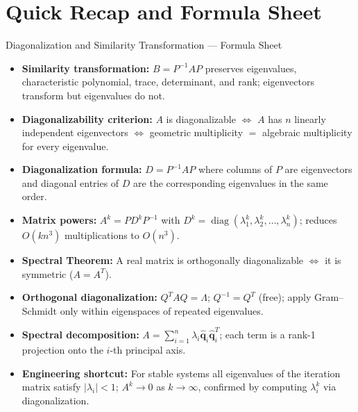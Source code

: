 \documentclass[12pt,a4paper]{article}
\begin{document}
\section{Quick Recap and Formula Sheet}

\begin{learnbox}{Diagonalization and Similarity Transformation --- Formula Sheet}
\begin{itemize}[leftmargin=*]
  \item \textbf{Similarity transformation:} $B = P^{-1}AP$ preserves eigenvalues, characteristic polynomial, trace, determinant, and rank; eigenvectors transform but eigenvalues do not.
  \item \textbf{Diagonalizability criterion:} $A$ is diagonalizable $\Leftrightarrow$ $A$ has $n$ linearly independent eigenvectors $\Leftrightarrow$ geometric multiplicity $=$ algebraic multiplicity for every eigenvalue.
  \item \textbf{Diagonalization formula:} $D = P^{-1}AP$ where columns of $P$ are eigenvectors and diagonal entries of $D$ are the corresponding eigenvalues in the same order.
  \item \textbf{Matrix powers:} $A^k = PD^kP^{-1}$ with $D^k = \operatorname{diag}(\lambda_1^k, \lambda_2^k, \ldots, \lambda_n^k)$; reduces $O(kn^3)$ multiplications to $O(n^3)$.
  \item \textbf{Spectral Theorem:} A real matrix is orthogonally diagonalizable $\Leftrightarrow$ it is symmetric ($A = A^T$).
  \item \textbf{Orthogonal diagonalization:} $Q^TAQ = \Lambda$; $Q^{-1} = Q^T$ (free); apply Gram--Schmidt only within eigenspaces of repeated eigenvalues.
  \item \textbf{Spectral decomposition:} $A = \sum_{i=1}^{n}\lambda_i\hat{\mathbf{q}}_i\hat{\mathbf{q}}_i^T$; each term is a rank-1 projection onto the $i$-th principal axis.
  \item \textbf{Engineering shortcut:} For stable systems all eigenvalues of the iteration matrix satisfy $|\lambda_i| < 1$; $A^k\to 0$ as $k\to\infty$, confirmed by computing $\lambda_i^k$ via diagonalization.
\end{itemize}
\end{learnbox}
\end{document}

